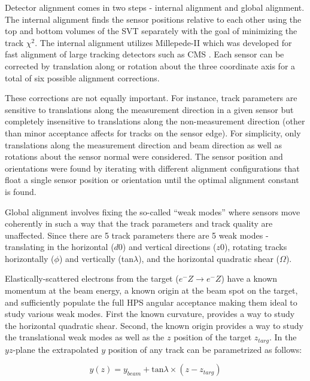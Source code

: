Detector alignment comes in two steps - internal alignment and global alignment. The internal alignment finds the sensor positions relative to each other using the top and bottom volumes of the SVT separately with the goal of minimizing the track $\chi^2$. The internal alignment utilizes Millepede-II which was developed for fast alignment of large tracking detectors such as CMS \cite{BLOBEL20065} \cite{BLOBEL20111760}. Each sensor can be corrected by translation along or rotation about the three coordinate axis for a total of six possible alignment corrections.

These corrections are not equally important. For instance, track parameters are sensitive to translations along the measurement direction in a given sensor but completely insensitive to translations along the non-measurement direction (other than minor acceptance affects for tracks on the sensor edge). For simplicity, only translations along the measurement direction and beam direction as well as rotations about the sensor normal were considered. The sensor position and orientations were found by iterating with different alignment configurations that float a single sensor position or orientation until the optimal alignment constant is found.

Global alignment involves fixing the so-called ``weak modes'' where sensors move coherently in such a way that the track parameters and track quality are unaffected. Since there are 5 track parameters there are 5 weak modes - translating in the horizontal ($d0$) and vertical directions ($z0$), rotating tracks horizontally ($\phi$) and vertically (tan$\lambda$), and the horizontal quadratic shear ($\Omega$).

Elastically-scattered electrons from the target ($e^-Z \rightarrow e^-Z$) have a known momentum at the beam energy, a known origin at the beam spot on the target, and sufficiently populate the full HPS angular acceptance making them ideal to study various weak modes. First the known curvature, provides a way to study the horizontal quadratic shear. Second, the known origin provides a way to study the translational weak modes as well as the $z$ position of the target $z_{targ}$. In the $yz$-plane the extrapolated $y$ position of any track can be parametrized as follows:

\begin{equation}
    y(z) = y_{beam} + \mathrm{tan} \lambda \times (z - z_{targ})
    \label{eqn:alignment}
\end{equation}

